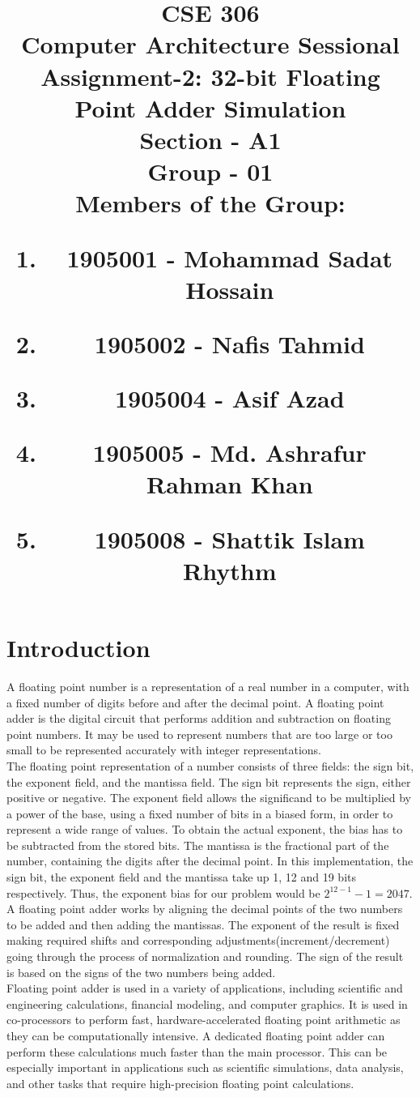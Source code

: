 \documentclass[12pt]{article}
\title{CSE 306 \\
Computer Architecture Sessional \\
\vspace{10mm}
Assignment-2: 32-bit Floating Point Adder Simulation \\
\vspace{20mm}
Section - A1 \\
Group - 01 \\
\vspace{15mm}
\RaggedRight
Members of the Group: \\
\normalsize	{
\begin{enumerate}[label=\roman*]
    \item 1905001 - Mohammad Sadat Hossain
    \item 1905002 - Nafis Tahmid
    \item 1905004 - Asif Azad
    \item 1905005 - Md. Ashrafur Rahman Khan
    \item 1905008 - Shattik Islam Rhythm
\end{enumerate}
}
}
\author{}
\date{}
\begin{document}
\maketitle

\newpage
\section{\large{Introduction}}
A floating point number is a representation of a real number in a computer, with a fixed number of digits before and after the decimal point. A floating point adder is the digital circuit that performs addition and subtraction on floating point numbers.  It may be used to represent numbers that are too large or too small to be represented accurately with integer representations.\\
\newline
The floating point representation of a number consists of three fields: the sign bit, the exponent field, and the mantissa field. The sign bit represents the sign, either positive or negative. The exponent field allows the significand to be multiplied by a power of the base, using a fixed number of bits in a biased form, in order to represent a wide range of values. To obtain the actual exponent, the bias has to be subtracted from the stored bits. The mantissa is the fractional part of the number, containing the digits after the decimal point.  In this implementation, the sign bit, the exponent field and the mantissa take up 1, 12 and 19 bits respectively. Thus, the exponent bias for our problem would be $2^{12-1} - 1 = 2047$.\\
\newline
A floating point adder works by aligning the decimal points of the two numbers to be added and then adding the mantissas. The exponent of the result is fixed making required shifts and corresponding adjustments(increment/decrement) going through the process of normalization and rounding. The sign of the result is based on the signs of the two numbers being added.\\
\newline
Floating point adder is used in a variety of applications, including scientific and engineering calculations, financial modeling, and computer graphics. It is used in co-processors to perform fast, hardware-accelerated floating point arithmetic as they can be computationally intensive. A dedicated floating point adder can perform these calculations much faster than the main processor. This can be especially important in applications such as scientific simulations, data analysis, and other tasks that require high-precision floating point calculations.\\
\end{document}
